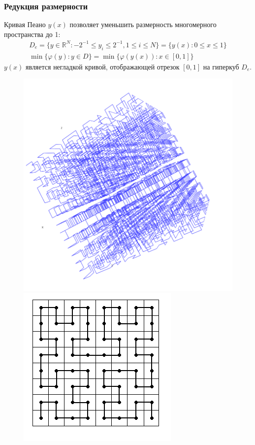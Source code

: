 \documentclass[aspectratio=1610]{beamer}
\begin{document}
\begin{frame}
  \frametitle{Редукция размерности}
  \begin{center}
  Кривая Пеано \(y(x)\) позволяет уменьшить размерность многомерного пространства до 1:
  \begin{gather}
    D_e=\lbrace y\in \mathbb{R}^N:-2^{-1}\leqslant y_i\leqslant 2^{-1},1\leqslant i\leqslant N\rbrace=\{y(x):0\leqslant x\leqslant 1\} \nonumber \\
    \min\{\varphi(y): y\in D\}=\min\{\varphi(y(x)): x\in [0,1]\} \nonumber
  \end{gather}
  \(y(x)\) является негладкой кривой, отображающей отрезок \([0,1]\) на гиперкуб \(D_e\).
  \begin{figure}[ht]
    \includegraphics[width=.35\textwidth]{peano3d.png}
    \includegraphics[width=.35\textwidth]{peano2d.png}
  \end{figure}
\end{center}
\end{frame}
\end{document}
